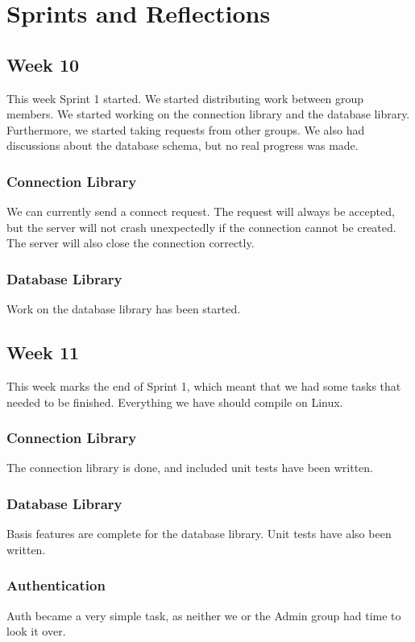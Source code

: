\section*{Sprints and Reflections}
\subsection{Week 10}
This week Sprint 1 started. We started distributing work between group members. We started working on the connection library and the database library. Furthermore, we started taking requests from other groups. We also had discussions about the database schema, but no real progress was made.


\subsubsection{Connection Library}
We can currently send a connect request. The request will always be accepted, but the server will not crash unexpectedly if the connection cannot be created. The server will also close the connection correctly.


\subsubsection{Database Library}
Work on the database library has been started.


\subsection{Week 11}
This week marks the end of Sprint 1, which meant that we had some tasks that needed to be finished. Everything we have should compile on Linux.


\subsubsection{Connection Library}
The connection library is done, and included unit tests have been written.


\subsubsection{Database Library}
Basis features are complete for the database library. Unit tests have also been written.


\subsubsection{Authentication}
Auth became a very simple task, as neither we or the Admin group had time to look it over.


